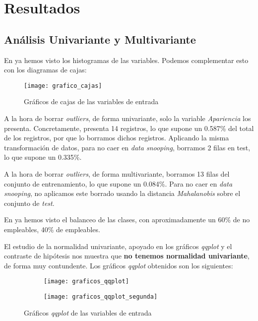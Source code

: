 \section{Resultados}

\subsection{Análisis Univariante y Multivariante}

En  ya hemos visto los histogramas de las variables. Podemos complementar esto con los diagramas de cajas:

\begin{figure}[H]
    \centering
    \texttt{[image: grafico\_cajas]}
    \caption{Gráficos de cajas de las variables de entrada}
\end{figure}

A la hora de borrar \textit{outliers}, de forma univariante, solo la variable \textit{Apariencia} los presenta. Concretamente, presenta 14 registros, lo que supone un 0.587\% del total de los registros, por que lo borramos dichos registros. Aplicando la misma transformación de datos, para no caer en \textit{data snooping}, borramos 2 filas en test, lo que supone un 0.335\%.

A la hora de borrar \textit{outliers}, de forma multivariante, borramos 13 filas del conjunto de entrenamiento, lo que supone un 0.084\%. Para no caer en \textit{data snooping}, no aplicamos este borrado usando la distancia \textit{Mahalanobis} sobre el conjunto de \textit{test}.

En  ya hemos visto el balanceo de las clases, con aproximadamente un 60\% de no empleables, 40\% de empleables.

El estudio de la normalidad univariante, apoyado en los gráficos \textit{qqplot} y el contraste de hipótesis nos muestra que \textbf{no tenemos normalidad univariante}, de forma muy contundente. Los gráficos \textit{qqplot} obtenidos son los siguientes:

\begin{figure}[H]
    \centering
    \begin{subfigure}{0.45\textwidth}
    \texttt{[image: graficos\_qqplot]}
    \end{subfigure}
    \begin{subfigure}{0.45\textwidth}
        \texttt{[image: graficos\_qqplot\_segunda]}
    \end{subfigure}

    \caption{Gráficos \textit{qqplot} de las variables de entrada}
\end{figure}

